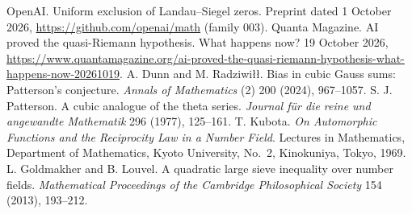  OpenAI. Uniform exclusion of Landau--Siegel zeros. Preprint dated 1 October 2026, \url{https://github.com/openai/math} (family 003). %
 Quanta Magazine. AI proved the quasi-Riemann hypothesis. What happens now? 19 October 2026, \url{https://www.quantamagazine.org/ai-proved-the-quasi-riemann-hypothesis-what-happens-now-20261019}. %
 A. Dunn and M. Radziwi\l\l. Bias in cubic Gauss sums: Patterson's conjecture. \emph{Annals of Mathematics} (2) 200 (2024), 967--1057. %
 S. J. Patterson. A cubic analogue of the theta series. \emph{Journal f\"ur die reine und angewandte Mathematik} 296 (1977), 125--161. %
 T. Kubota. \emph{On Automorphic Functions and the Reciprocity Law in a Number Field}. Lectures in Mathematics, Department of Mathematics, Kyoto University, No.~2, Kinokuniya, Tokyo, 1969. %
 L. Goldmakher and B. Louvel. A quadratic large sieve inequality over number fields. \emph{Mathematical Proceedings of the Cambridge Philosophical Society} 154 (2013), 193--212. %
